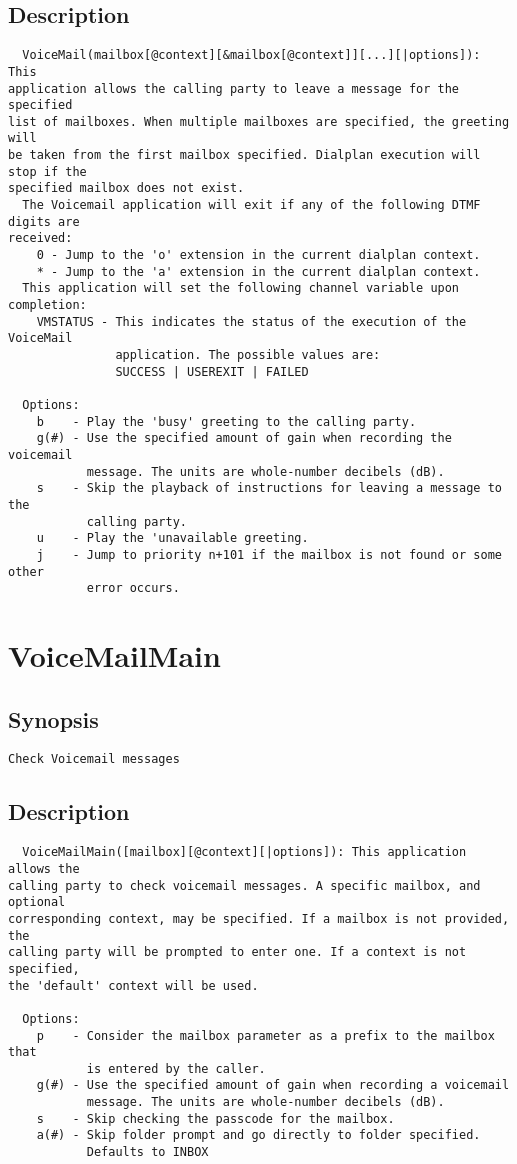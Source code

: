 \subsection{Description}
\begin{verbatim}
  VoiceMail(mailbox[@context][&mailbox[@context]][...][|options]): This
application allows the calling party to leave a message for the specified
list of mailboxes. When multiple mailboxes are specified, the greeting will
be taken from the first mailbox specified. Dialplan execution will stop if the
specified mailbox does not exist.
  The Voicemail application will exit if any of the following DTMF digits are
received:
    0 - Jump to the 'o' extension in the current dialplan context.
    * - Jump to the 'a' extension in the current dialplan context.
  This application will set the following channel variable upon completion:
    VMSTATUS - This indicates the status of the execution of the VoiceMail
               application. The possible values are:
               SUCCESS | USEREXIT | FAILED

  Options:
    b    - Play the 'busy' greeting to the calling party.
    g(#) - Use the specified amount of gain when recording the voicemail
           message. The units are whole-number decibels (dB).
    s    - Skip the playback of instructions for leaving a message to the
           calling party.
    u    - Play the 'unavailable greeting.
    j    - Jump to priority n+101 if the mailbox is not found or some other
           error occurs.

\end{verbatim}


\section{VoiceMailMain}
\subsection{Synopsis}
\begin{verbatim}
Check Voicemail messages
\end{verbatim}
\subsection{Description}
\begin{verbatim}
  VoiceMailMain([mailbox][@context][|options]): This application allows the
calling party to check voicemail messages. A specific mailbox, and optional
corresponding context, may be specified. If a mailbox is not provided, the
calling party will be prompted to enter one. If a context is not specified,
the 'default' context will be used.

  Options:
    p    - Consider the mailbox parameter as a prefix to the mailbox that
           is entered by the caller.
    g(#) - Use the specified amount of gain when recording a voicemail
           message. The units are whole-number decibels (dB).
    s    - Skip checking the passcode for the mailbox.
    a(#) - Skip folder prompt and go directly to folder specified.
           Defaults to INBOX

\end{verbatim}


